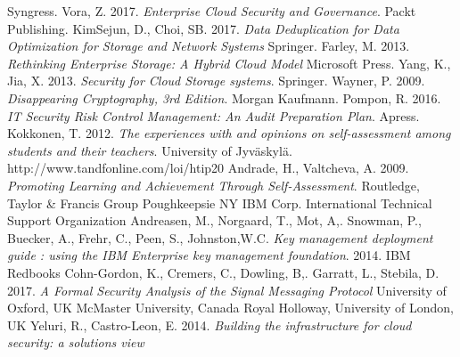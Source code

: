 \documentclass{article}
\begin{document}
\begin{thebibliography}{9}
	Syngress.
        Vora, Z.
        2017.
	\textit{Enterprise Cloud Security and Governance}.
	Packt Publishing.
        KimSejun, D.,
        Choi, SB.
        2017.
	\textit{Data Deduplication for Data Optimization for Storage and Network Systems}
        Springer.
        Farley, M.
        2013.
	\textit{Rethinking Enterprise Storage: A Hybrid Cloud Model}
        Microsoft Press.
        Yang, K.,
	Jia, X.
        2013.
	\textit{Security for Cloud Storage systems}.
        Springer.
        Wayner, P.
        2009.
	\textit{Disappearing Cryptography, 3rd Edition}.
        Morgan Kaufmann.
        Pompon, R.
        2016.
        \textit{IT Security Risk Control Management: An Audit Preparation Plan}.
	Apress.
        Kokkonen, T.
        2012.
        \textit{The experiences with and opinions on self-assessment among students and their teachers}.
	University of Jyväskylä.
        http://www.tandfonline.com/loi/htip20
        Andrade, H.,
        Valtcheva, A.
	2009.
	\textit{Promoting Learning and Achievement Through Self-Assessment}.
	Routledge, Taylor \& Francis Group
        Poughkeepsie NY IBM Corp. International Technical Support Organization
        Andreasen, M.,
        Norgaard, T.,
        Mot, A,.
        Snowman, P.,
        Buecker, A.,
        Frehr, C.,
        Peen, S.,
        Johnston,W.C.
	\textit{Key management deployment guide : using the IBM Enterprise key management foundation}.
        2014.
	IBM Redbooks
        Cohn-Gordon, K.,
        Cremers, C.,
        Dowling, B,.
        Garratt, L.,
        Stebila, D.
        2017.
        \textit{A Formal Security Analysis of the Signal Messaging Protocol}
	University of Oxford, UK
        McMaster University, Canada
        Royal Holloway, University of London, UK
        Yeluri, R.,
        Castro-Leon, E.
        2014.
	\textit{Building the infrastructure for cloud security: a solutions view}

\end{thebibliography}
\end{document}
